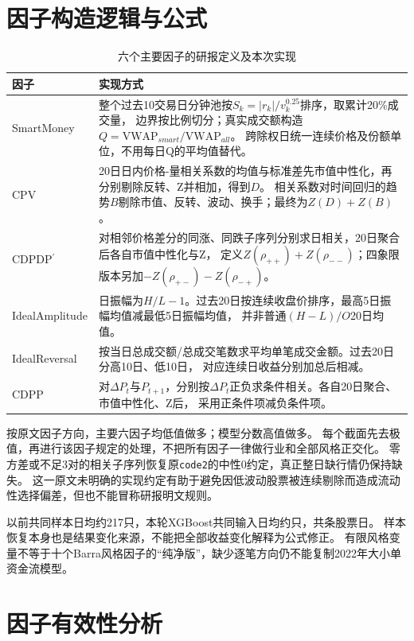 \documentclass[UTF8,zihao=-4,fontset=fandol]{ctexart}
\begin{document}
\clearpage
\section{因子构造逻辑与公式}
\begin{table}[H]\centering\small
\caption{六个主要因子的研报定义及本次实现}
\begin{tabularx}{\linewidth}{p{28mm}X}\toprule
因子 & 实现方式\\\midrule
SmartMoney & 整个过去10交易日分钟池按$S_k=|r_k|/v_k^{0.25}$排序，取累计20\%成交量，
边界按比例切分；真实成交额构造$Q=\mathrm{VWAP}_{smart}/\mathrm{VWAP}_{all}$。
跨除权日统一连续价格及份额单位，不用每日Q的平均值替代。\\[2pt]
CPV & 20日日内价格-量相关系数的均值与标准差先市值中性化，再分别剔除反转、Z并相加，得到$D$。
相关系数对时间回归的趋势$B$剔除市值、反转、波动、换手；最终为$Z(D)+Z(B)$。\\[2pt]
CDPDP$^{\prime}$ & 对相邻价格差分的同涨、同跌子序列分别求日相关，20日聚合后各自市值中性化与Z，
定义$Z(\rho_{++})+Z(\rho_{--})$；四象限版本另加$-Z(\rho_{+-})-Z(\rho_{-+})$。\\[2pt]
IdealAmplitude & 日振幅为$H/L-1$。过去20日按连续收盘价排序，最高5日振幅均值减最低5日振幅均值，
并非普通$(H-L)/O$20日均值。\\[2pt]
IdealReversal & 按当日总成交额/总成交笔数求平均单笔成交金额。过去20日分高10日、低10日，
对应连续日收益分别加总后相减。\\[2pt]
CDPP & 对$\Delta P_t$与$P_{t+1}$，分别按$\Delta P_t$正负求条件相关。各自20日聚合、市值中性化、Z后，
采用正条件项减负条件项。\\\bottomrule
\end{tabularx}\end{table}

按原文因子方向，主要六因子均低值做多；模型分数高值做多。
每个截面先去极值，再进行该因子规定的处理，不把所有因子一律做行业和全部风格正交化。
零方差或不足3对的相关子序列恢复原\texttt{code2}的中性0约定，真正整日缺行情仍保持缺失。
这一原文未明确的实现约定有助于避免因低波动股票被连续剔除而造成流动性选择偏差，但也不能冒称研报明文规则。

以前共同样本日均约217只，本轮XGBoost共同输入日均约\ModelMeanStocks 只，共\ModelRows 条股票日。
样本恢复本身也是结果变化来源，不能把全部收益变化解释为公式修正。
有限风格变量不等于十个Barra风格因子的“纯净版”，缺少逐笔方向仍不能复制2022年大小单资金流模型。

\clearpage
\section{因子有效性分析}
\end{document}
